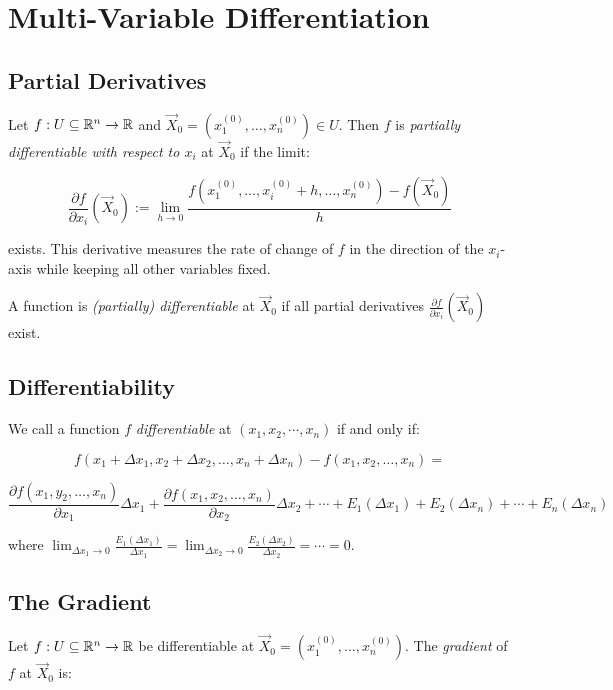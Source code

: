 \chapter{Multi-Variable Differentiation}

\section{Partial Derivatives}

Let \( f : U \subseteq \mathbb{R}^n \to \mathbb{R} \) and \( \vec{X}_0 = (x_1^{(0)}, \dots, x_n^{(0)}) 
\in U \). Then \(f\) is \emph{partially differentiable with respect to \( x_i \)} at 
\( \vec{X}_0 \) if the limit:

\[
    \frac{\partial f}{\partial x_i}(\vec{X}_0) := \lim_{h \to 0} \frac{f(x_1^{(0)}, \dots, x_i^{(0)} + h,
     \dots, x_n^{(0)}) - f(\vec{X}_0)}{h}
\]

exists. This derivative measures the rate of change of \(f\) in the direction of the \( x_i \)-axis 
while keeping all other variables fixed.

A function is \emph{(partially) differentiable} at \( \vec{X}_0 \) if all partial derivatives 
\( \frac{\partial f}{\partial x_i}(\vec{X}_0) \) exist.

\section{Differentiability}

We call a function \(f\) \emph{differentiable} at \((x_1, x_2, \cdots, x_n)\) if and only if:

\[
    f(x_1 + \Delta x_1, x_2 + \Delta x_2, \dots, x_n + \Delta x_n) - f(x_1, x_2, \dots, x_n) = 
\]

\[
    \frac{\partial f(x_1, y_2, \dots, x_n)}{\partial x_1} \Delta x_1 + \frac{\partial f(x_1, x_2, 
    \dots, x_n)}{\partial x_2} \Delta x_2 + \cdots + E_1(\Delta x_1) + E_2(\Delta x_n) + \cdots + 
    E_n(\Delta x_n)
\]

where \(\lim_{\Delta x_1 \to 0}\frac{E_1(\Delta x_1)}{\Delta x_1} = \lim_{\Delta x_2 \to 0}
\frac{E_2(\Delta x_2)}{\Delta x_2} = \cdots = 0\).

\section{The Gradient}

Let \( f : U \subseteq \mathbb{R}^n \to \mathbb{R} \) be differentiable at \( \vec{X}_0 = (x_1^{(0)}, 
\dots, x_n^{(0)}) \). The \emph{gradient} of \(f\) at \( \vec{X}_0 \) is:

